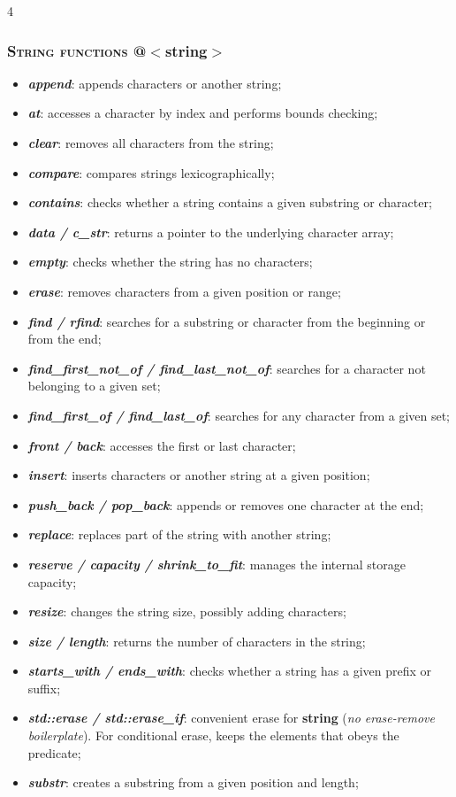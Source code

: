 \documentclass[10pt]{article}
\begin{document}
\begin{multicols*}{4}
{\subsubsection*{\textsc{String functions} @$<$string$>$}
\begin{itemize}[leftmargin=*,topsep=0.25pt]
\setlength\itemsep{-1.8pt}

\item \emph{\textbf{append}}: appends characters or another string;
\item \emph{\textbf{at}}: accesses a character by index and  performs bounds checking;
\item \emph{\textbf{clear}}: removes all characters from the string;
\item \emph{\textbf{compare}}: compares strings lexicographically;
\item \emph{\textbf{contains}}: checks whether a string contains a given substring or character;
\item \emph{\textbf{data / c\_str}}: returns a pointer to the underlying character array;
\item \emph{\textbf{empty}}: checks whether the string has no characters;
\item \emph{\textbf{erase}}: removes characters from a given position or range;
\item \emph{\textbf{find / rfind}}: searches for a substring or character from the beginning or from the end;
\item \emph{\textbf{find\_first\_not\_of / find\_last\_not\_of}}: searches for a character not belonging to a given set;
\item \emph{\textbf{find\_first\_of / find\_last\_of}}: searches for any character from a given set;
\item \emph{\textbf{front / back}}: accesses the first or last character;
\item \emph{\textbf{insert}}: inserts characters or another string at a given position;
\item \emph{\textbf{push\_back / pop\_back}}: appends or removes one character at the end;
\item \emph{\textbf{replace}}: replaces part of the string with another string;
\item \emph{\textbf{reserve / capacity / shrink\_to\_fit}}: manages the internal storage capacity;
\item \emph{\textbf{resize}}: changes the string size, possibly adding characters;
\item \emph{\textbf{size / length}}: returns the number of characters in the string;
\item \emph{\textbf{starts\_with / ends\_with}}: checks whether a string has a given prefix or suffix;
\item \emph{\textbf{std::erase / std::erase\_if}}: convenient erase for \textbf{string} (\emph{no erase-remove boilerplate}). For conditional erase, keeps the elements that obeys the predicate;
\item \emph{\textbf{substr}}: creates a substring from a given position and length;
\end{itemize}



}
\end{multicols*}
\end{document}
